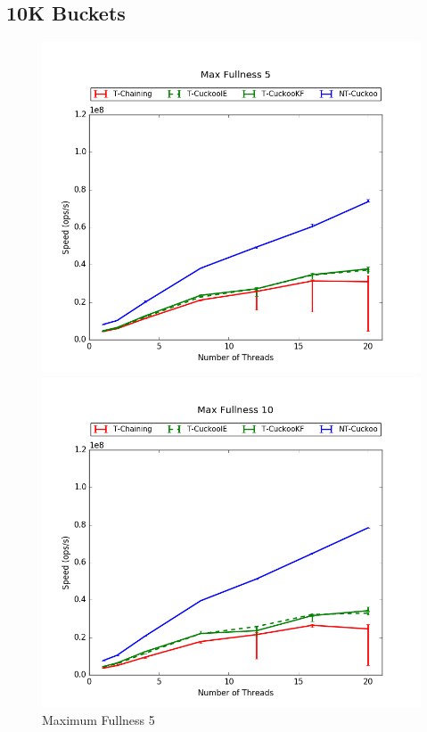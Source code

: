 \subsection{10K Buckets}
\begin{figure}[H]
    \centering
	\begin{minipage}{0.45\textwidth}\includegraphics[width=\textwidth]{maps/5HM10K:F34,I33,E33.png} 
        \caption*{Maximum Fullness 5}
    \end{minipage}
	\begin{minipage}{0.45\textwidth}\includegraphics[width=\textwidth]{maps/10HM10K:F34,I33,E33.png} 

\end{minipage}
\end{figure}

